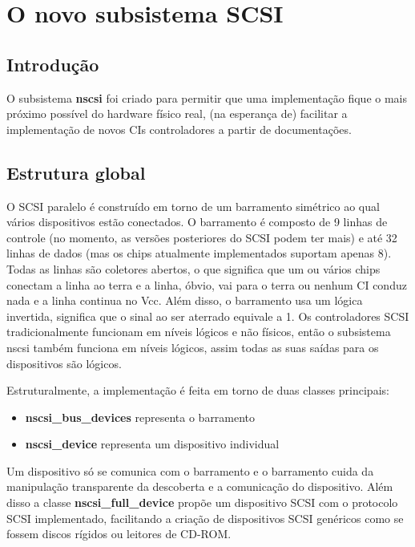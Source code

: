 \documentclass[letterpaper,10pt,brazil]{sphinxmanual}
\begin{document}
\section{O novo subsistema SCSI}
\label{techspecs/nscsi:o-novo-subsistema-scsi}\label{techspecs/nscsi::doc}

\subsection{Introdução}
\label{techspecs/nscsi:introducao}
O subsistema \textbf{nscsi} foi criado para permitir que uma implementação
fique o mais próximo possível do hardware físico real, (na esperança de)
facilitar a implementação de novos CIs controladores a partir de
documentações.


\subsection{Estrutura global}
\label{techspecs/nscsi:estrutura-global}
O SCSI paralelo é construído em torno de um barramento simétrico ao qual
vários dispositivos estão conectados. O barramento é composto de 9
linhas de controle (no momento, as versões posteriores do SCSI podem ter
mais) e até 32 linhas de dados (mas os chips atualmente implementados
suportam apenas 8). Todas as linhas são coletores abertos, o que
significa que um ou vários chips conectam a linha ao terra e a linha,
óbvio, vai para o terra ou nenhum CI conduz nada e a linha continua no
Vcc. Além disso, o barramento usa um lógica invertida, significa que o
sinal ao ser aterrado equivale a 1.
Os controladores SCSI tradicionalmente funcionam em níveis lógicos e não
físicos, então o subsistema nscsi também funciona em níveis lógicos,
assim todas as suas saídas para os dispositivos são lógicos.

Estruturalmente, a implementação é feita em torno de duas classes
principais:
\begin{itemize}
\item {} 
\textbf{nscsi\_bus\_devices} representa o barramento

\item {} 
\textbf{nscsi\_device} representa um dispositivo individual

\end{itemize}

Um dispositivo só se comunica com o barramento e o barramento cuida da
manipulação transparente da descoberta e a comunicação do dispositivo.
Além disso a classe \textbf{nscsi\_full\_device} propõe um dispositivo SCSI com
o protocolo SCSI implementado, facilitando a criação de dispositivos
SCSI genéricos como se fossem discos rígidos ou leitores de CD-ROM.
\end{document}

